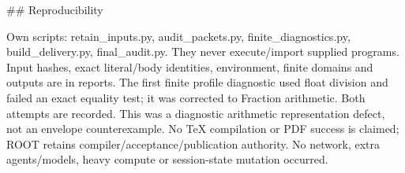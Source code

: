 \documentclass[11pt]{article}
\begin{document}
\begin{OwnProofBody}
## Reproducibility

Own scripts: retain_inputs.py, audit_packets.py, finite_diagnostics.py, build_delivery.py, final_audit.py. They never execute/import supplied programs. Input hashes, exact literal/body identities, environment, finite domains and outputs are in reports. The first finite profile diagnostic used float division and failed an exact equality test; it was corrected to Fraction arithmetic. Both attempts are recorded. This was a diagnostic arithmetic representation defect, not an envelope counterexample. No TeX compilation or PDF success is claimed; ROOT retains compiler/acceptance/publication authority. No network, extra agents/models, heavy compute or session-state mutation occurred.

\end{OwnProofBody}
\end{document}
